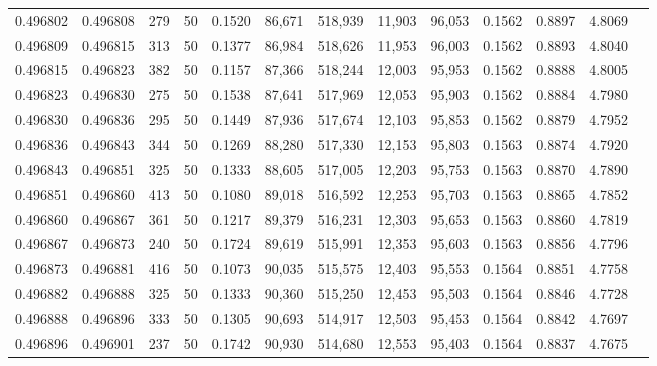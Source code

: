\begin{tabular}{rrrrrrrrrrrrr}
0.496802 & 0.496808 & 279 &  50 &                                     0.1520 &  86,671 & 518,939 &  11,903 &  96,053 & 0.1562 & 0.8897 & 4.8069 \\
0.496809 & 0.496815 & 313 &  50 &                                     0.1377 &  86,984 & 518,626 &  11,953 &  96,003 & 0.1562 & 0.8893 & 4.8040 \\
0.496815 & 0.496823 & 382 &  50 &                                     0.1157 &  87,366 & 518,244 &  12,003 &  95,953 & 0.1562 & 0.8888 & 4.8005 \\
0.496823 & 0.496830 & 275 &  50 &                                     0.1538 &  87,641 & 517,969 &  12,053 &  95,903 & 0.1562 & 0.8884 & 4.7980 \\
0.496830 & 0.496836 & 295 &  50 &                                     0.1449 &  87,936 & 517,674 &  12,103 &  95,853 & 0.1562 & 0.8879 & 4.7952 \\
0.496836 & 0.496843 & 344 &  50 &                                     0.1269 &  88,280 & 517,330 &  12,153 &  95,803 & 0.1563 & 0.8874 & 4.7920 \\
0.496843 & 0.496851 & 325 &  50 &                                     0.1333 &  88,605 & 517,005 &  12,203 &  95,753 & 0.1563 & 0.8870 & 4.7890 \\
0.496851 & 0.496860 & 413 &  50 &                                     0.1080 &  89,018 & 516,592 &  12,253 &  95,703 & 0.1563 & 0.8865 & 4.7852 \\
0.496860 & 0.496867 & 361 &  50 &                                     0.1217 &  89,379 & 516,231 &  12,303 &  95,653 & 0.1563 & 0.8860 & 4.7819 \\
0.496867 & 0.496873 & 240 &  50 &                                     0.1724 &  89,619 & 515,991 &  12,353 &  95,603 & 0.1563 & 0.8856 & 4.7796 \\
0.496873 & 0.496881 & 416 &  50 &                                     0.1073 &  90,035 & 515,575 &  12,403 &  95,553 & 0.1564 & 0.8851 & 4.7758 \\
0.496882 & 0.496888 & 325 &  50 &                                     0.1333 &  90,360 & 515,250 &  12,453 &  95,503 & 0.1564 & 0.8846 & 4.7728 \\
0.496888 & 0.496896 & 333 &  50 &                                     0.1305 &  90,693 & 514,917 &  12,503 &  95,453 & 0.1564 & 0.8842 & 4.7697 \\
0.496896 & 0.496901 & 237 &  50 &                                     0.1742 &  90,930 & 514,680 &  12,553 &  95,403 & 0.1564 & 0.8837 & 4.7675 \\

\end{tabular}
